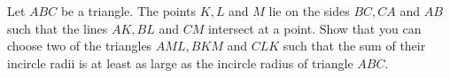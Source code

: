 Let $ABC$ be a triangle. The points $K, L$ and $M$ lie on the sides $BC, CA$ and $AB$ such that the lines $AK, BL$ and $CM$ intersect at a point. Show that you can choose two of the triangles $AML, BKM$ and $CLK$ such that the sum of their incircle radii is at least as large as the incircle radius of triangle $ABC$.  